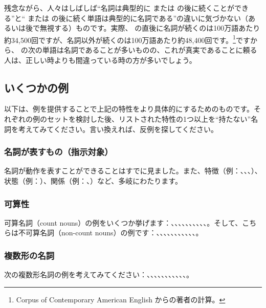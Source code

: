残念ながら、人々はしばしば\enquote{名詞は典型的に  または  の後に続くことができる}と\enquote{ または  の後に続く単語は典型的に名詞である}の違いに気づかない（あるいは後で無視する）ものです。実際、 の直後に名詞が続くのは100万語あたり約34,500回ですが、名詞以外が続くのは100万語あたり約48,400回です。\footnote{Corpus of Contemporary American English \citep{COCA}からの著者の計算。}ですから、 の次の単語は名詞であることが多いものの、これが真実であることに頼る人は、正しい時よりも間違っている時の方が多いでしょう。

\subsection{いくつかの例}\label{sec:examples}
以下は、例を提供することで上記の特性をより具体的にするためのものです。それぞれの例のセットを検討した後、リストされた特性の1つ以上を\enquote{持たない}名詞を考えてみてください。言い換えれば、反例を探してください。


\subsubsection*{名詞が表すもの（指示対象）}
名詞が動作を表すことができることはすでに見ました。また、特徴（例：、、、）、状態（例：）、関係（例：、）など、多岐にわたります。

\subsubsection*{可算性}

可算名詞（count nouns）の例をいくつか挙げます：、、、、、、、、、、。そして、こちらは不可算名詞（non-count nouns）の例です：、、、、、、、、、、、。

\subsubsection*{複数形の名詞}
次の複数形名詞の例を考えてみてください：、、、、、、、、、、、。

